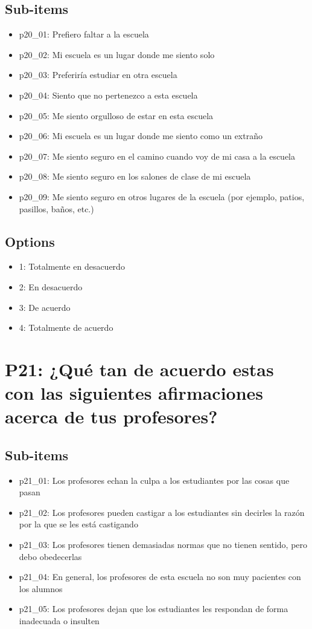 \documentclass[11pt]{article}
\begin{document}
\subsection*{Sub-items}
\begin{itemize}[leftmargin=*]
  \item p20\_01: Prefiero faltar a la escuela
  \item p20\_02: Mi escuela es un lugar donde me siento solo
  \item p20\_03: Preferiría estudiar en otra escuela
  \item p20\_04: Siento que no pertenezco a esta escuela
  \item p20\_05: Me siento orgulloso de estar en esta escuela
  \item p20\_06: Mi escuela es un lugar donde me siento como un extraño
  \item p20\_07: Me siento seguro en el camino cuando voy de mi casa a la escuela
  \item p20\_08: Me siento seguro en los salones de clase de mi escuela
  \item p20\_09: Me siento seguro en otros lugares de la escuela (por ejemplo, patios, pasillos, baños, etc.)
\end{itemize}
\subsection*{Options}
\begin{itemize}[leftmargin=*]
  \item 1: Totalmente en desacuerdo
  \item 2: En desacuerdo
  \item 3: De acuerdo
  \item 4: Totalmente de acuerdo
\end{itemize}
\bigskip
\section*{P21: ¿Qué tan de acuerdo estas con las siguientes afirmaciones acerca de tus profesores?}
\subsection*{Sub-items}
\begin{itemize}[leftmargin=*]
  \item p21\_01: Los profesores echan la culpa a los estudiantes por las cosas que pasan
  \item p21\_02: Los profesores pueden castigar a los estudiantes sin decirles la razón por la que se les está castigando
  \item p21\_03: Los profesores tienen demasiadas normas que no tienen sentido, pero debo obedecerlas
  \item p21\_04: En general, los profesores de esta escuela no son muy pacientes con los alumnos
  \item p21\_05: Los profesores dejan que los estudiantes les respondan de forma inadecuada o insulten
\end{itemize}
\end{document}
